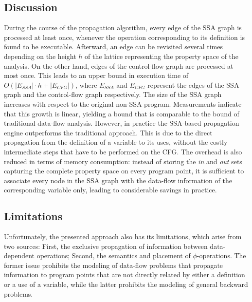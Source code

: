\subsection{Discussion}

{
\def\ESSA{E_{\textit{SSA}}}
\def\ECFG{E_{\textit{CFG}}}
During the course of the propagation algorithm, every edge of the SSA graph is
processed at least once, whenever the operation corresponding to its definition
is found to be executable. Afterward, an edge can be revisited several times
depending on the height $h$ of the lattice representing the property
space of the analysis. On the other hand, edges of the control-flow graph are processed at most
once. This leads to an upper bound in execution time of $O(|\ESSA| \cdot h +
|\ECFG|)$, where $\ESSA$ and $\ECFG$ represent the edges of the SSA graph
and the control-flow graph respectively. The size of the
SSA graph increases with respect to the original non-SSA program. Measurements
indicate that this growth is linear, yielding a
bound that is comparable to the bound of traditional data-flow analysis.
However, in practice the SSA-based propagation engine outperforms the
traditional approach. This is  due to the direct propagation from the definition
of a variable to its uses, without the costly intermediate steps that have to be
performed on the CFG. The overhead is also reduced in terms of memory
consumption: instead of storing the \emph{in} and \emph{out} sets capturing the
complete property space on every program point, it is sufficient to
associate every node in the SSA graph with the data-flow information of the
corresponding variable only, leading to considerable savings in practice.
}

\subsection{Limitations}

Unfortunately, the presented approach also has its limitations, which arise from
two sources: First, the exclusive
propagation of information between data-dependent operations; Second, the
semantics and placement of $\phi$-operations. The former issue prohibits the
modeling of data-flow problems that propagate information to program points that
are not directly related by either a definition or a use of a variable, while
the latter prohibits the modeling of general backward problems.

